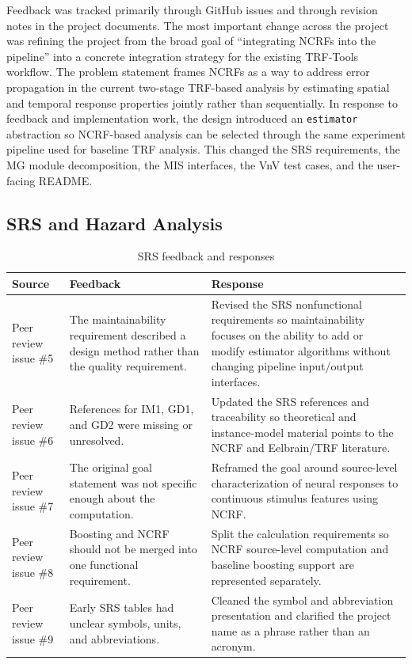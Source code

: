 \documentclass{article}
\begin{document}
Feedback was tracked primarily through GitHub issues and through revision notes in the project documents. The most important change across the project was refining the project from the broad goal of ``integrating NCRFs into the pipeline'' into a concrete integration strategy for the existing TRF-Tools workflow. The problem statement frames NCRFs as a way to address error propagation in the current two-stage TRF-based analysis by estimating spatial and temporal response properties jointly rather than sequentially. In response to feedback and implementation work, the design introduced an \texttt{estimator} abstraction so NCRF-based analysis can be selected through the same experiment pipeline used for baseline TRF analysis. This changed the SRS requirements, the MG module decomposition, the MIS interfaces, the VnV test cases, and the user-facing README.

\subsection{SRS and Hazard Analysis}

\begin{table}[H]
\centering
\begin{tabularx}{\textwidth}{p{} p{} X}
\toprule
\textbf{Source} & \textbf{Feedback} & \textbf{Response}\\
\midrule
Peer review issue \#5 & The maintainability requirement described a design method rather than the quality requirement. & Revised the SRS nonfunctional requirements so maintainability focuses on the ability to add or modify estimator algorithms without changing pipeline input/output interfaces.\\
Peer review issue \#6 & References for IM1, GD1, and GD2 were missing or unresolved. & Updated the SRS references and traceability so theoretical and instance-model material points to the NCRF and Eelbrain/TRF literature.\\
Peer review issue \#7 & The original goal statement was not specific enough about the computation. & Reframed the goal around source-level characterization of neural responses to continuous stimulus features using NCRF.\\
Peer review issue \#8 & Boosting and NCRF should not be merged into one functional requirement. & Split the calculation requirements so NCRF source-level computation and baseline boosting support are represented separately.\\
Peer review issue \#9 & Early SRS tables had unclear symbols, units, and abbreviations. & Cleaned the symbol and abbreviation presentation and clarified the project name as a phrase rather than an acronym.\\
\bottomrule
\end{tabularx}
\caption{SRS feedback and responses}
\end{table}
\end{document}
